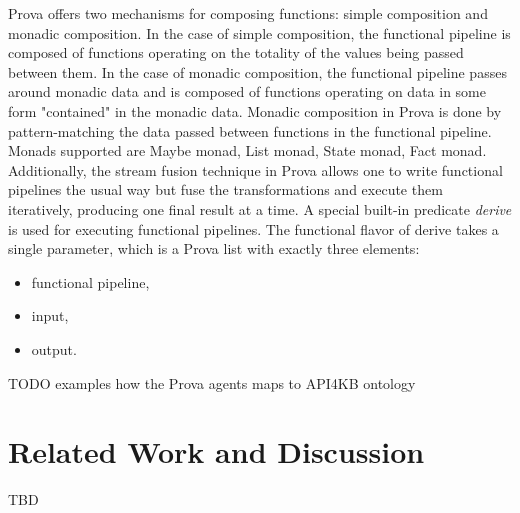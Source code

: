 \documentclass[runningheads]{llncs}
\begin{document}
Prova offers two mechanisms for composing functions: simple composition and monadic composition. In the case of simple composition, the functional pipeline is composed of functions operating on the totality of the values being passed between them. In the case of monadic composition, the functional pipeline passes around monadic data and is composed of functions operating on data in some form "contained" in the monadic data. Monadic composition in Prova is done by pattern-matching the data passed between functions in the functional pipeline.
Monads supported are Maybe monad,  List monad, State monad, Fact monad. Additionally, the stream fusion technique in Prova allows one to write functional pipelines the usual way but fuse the transformations and execute them iteratively, producing one final result at a time. A special built-in predicate \textit{derive} is used for executing functional pipelines. The functional flavor of derive takes a single parameter, which is a Prova list with exactly three elements:
\begin{itemize}
  \item functional pipeline,
  \item input,
  \item output.
\end{itemize}
    
TODO examples how the Prova agents maps to API4KB ontology


\section{Related Work and Discussion}
TBD


\end{document}
